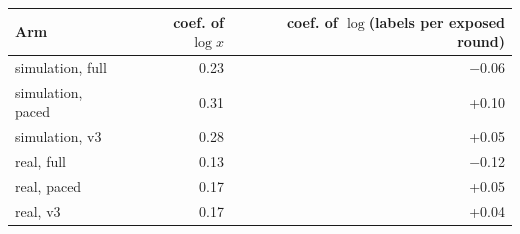 \begin{tabular}{@{}l r r@{}}
\toprule
Arm & coef. of $\log x$ & coef. of $\log$(labels per exposed round) \\
\midrule
simulation, full & 0.23 & $-$0.06 \\
simulation, paced & 0.31 & +0.10 \\
simulation, v3 & 0.28 & +0.05 \\
real, full & 0.13 & $-$0.12 \\
real, paced & 0.17 & +0.05 \\
real, v3 & 0.17 & +0.04 \\
\bottomrule
\end{tabular}
